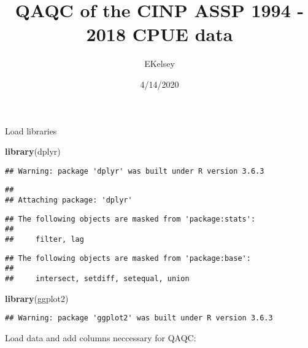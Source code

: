 \documentclass[
]{article}
\title{QAQC of the CINP ASSP 1994 - 2018 CPUE data}
\author{EKelsey}
\date{4/14/2020}
\newenvironment{Shaded}{\begin{snugshade}}{\end{snugshade}}
\newcommand{\KeywordTok}[1]{\textcolor[rgb]{0.13,0.29,0.53}{\textbf{#1}}}
\newcommand{\NormalTok}[1]{#1}
\begin{document}
\maketitle

Load libraries

\begin{Shaded}
\begin{Highlighting}[]
\KeywordTok{library}\NormalTok{(dplyr)}
\end{Highlighting}
\end{Shaded}

\begin{verbatim}
## Warning: package 'dplyr' was built under R version 3.6.3
\end{verbatim}

\begin{verbatim}
## 
## Attaching package: 'dplyr'
\end{verbatim}

\begin{verbatim}
## The following objects are masked from 'package:stats':
## 
##     filter, lag
\end{verbatim}

\begin{verbatim}
## The following objects are masked from 'package:base':
## 
##     intersect, setdiff, setequal, union
\end{verbatim}

\begin{Shaded}
\begin{Highlighting}[]
\KeywordTok{library}\NormalTok{(ggplot2)}
\end{Highlighting}
\end{Shaded}

\begin{verbatim}
## Warning: package 'ggplot2' was built under R version 3.6.3
\end{verbatim}

Load data and add columns neccessary for QAQC:
\end{document}
